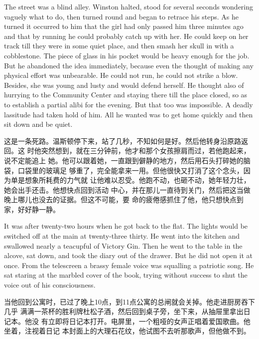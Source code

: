 \begin{paracol}{2}
The street was a blind alley. Winston halted, stood for several seconds
wondering vaguely what to do, then turned round and began to retrace his
steps. As he turned it occurred to him that the girl had only passed him
three minutes ago and that by running he could probably catch up with
her. He could keep on her track till they were in some quiet place, and
then smash her skull in with a cobblestone. The piece of glass in his
pocket would be heavy enough for the job. But he abandoned the idea
immediately, because even the thought of making any physical effort was
unbearable. He could not run, he could not strike a blow. Besides, she
was young and lusty and would defend herself. He thought also of
hurrying to the Community Center and staying there till the place
closed, so as to establish a partial alibi for the evening. But that too
was impossible. A deadly lassitude had taken hold of him. All he wanted
was to get home quickly and then sit down and be quiet.

\switchcolumn

这是一条死路。温斯顿停下来，站了几秒，不知如何是好。然后他转身沿原路返回。这
时他突然想到，就在三分钟前，他才和那个女孩擦肩而过，若他跑起来，说不定能追上
她。他可以跟着她，一直跟到僻静的地方，然后用石头打碎她的脑袋，口袋里的玻璃足
够重了，完全能拿来一用。但他很快又打消了这个念头，因为单是想象所耗费的力气就
让他难以忍受。他跑不动，也砸不动，她年轻力壮，她会出手还击。他想快点回到活动
中心，并在那儿一直待到关门，然后把这当做晚上哪儿也没去的证据。但这不可能，要
命的疲倦感抓住了他，他只想快点到家，好好静一静。

\switchcolumn*

It was after twenty-two hours when he got back to the flat. The lights
would be switched off at the main at twenty-three thirty. He went into
the kitchen and swallowed nearly a teacupful of Victory Gin. Then he
went to the table in the alcove, sat down, and took the diary out of the
drawer. But he did not open it at once. From the telescreen a brassy
female voice was squalling a patriotic song. He sat staring at the
marbled cover of the book, trying without success to shut the voice out
of his consciousness.

\switchcolumn

当他回到公寓时，已过了晚上10点，到11点公寓的总闸就会关掉。他走进厨房吞下几乎
满满一茶杯的胜利牌杜松子酒，然后回到桌子旁，坐下来，从抽屉里拿出日记本。他没
有立即将日记本打开。电屏里，一个粗哑的女声正唱着爱国歌曲。他坐着，注视着日记
本封面上的大理石花纹，他试图不去听那歌声，但他做不到。


\end{paracol}
